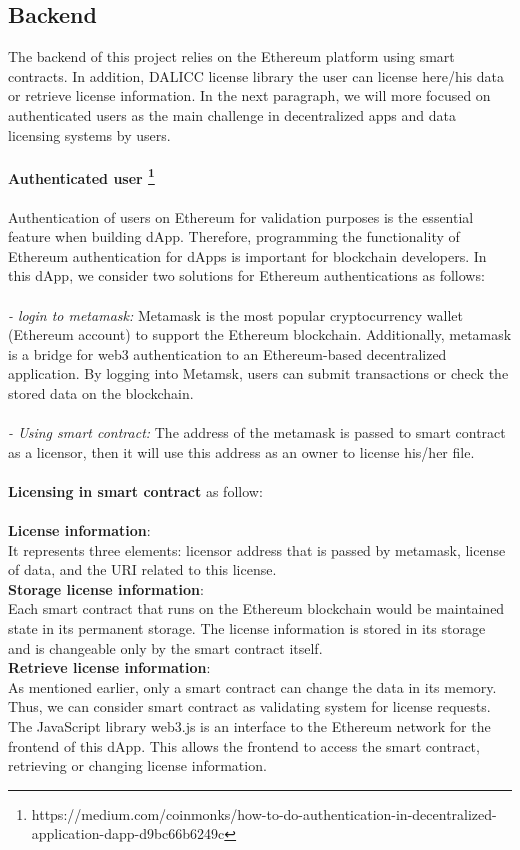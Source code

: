 \subsection{Backend} The backend of this project relies on the Ethereum platform using smart contracts. In addition, DALICC license library the user can license here/his data or retrieve license information. In the next paragraph, we will more focused on authenticated users as the main challenge in decentralized apps and data licensing systems by users. \\
\\
\textbf{Authenticated user \footnote{https://medium.com/coinmonks/how-to-do-authentication-in-decentralized-application-dapp-d9bc66b6249c}} \\
\\
Authentication of users on Ethereum for validation purposes is the essential feature when building dApp.  Therefore, programming the functionality of Ethereum authentication for dApps is important for blockchain developers. 
In this dApp, we consider two solutions for Ethereum authentications as follows: \\
\\
\textit{- login to metamask:} Metamask is the most popular cryptocurrency wallet (Ethereum account) to support the Ethereum blockchain. Additionally, metamask is a bridge for web3 authentication to an Ethereum-based decentralized application. By logging into Metamsk, users can submit transactions or check the stored data on the blockchain.\\
\\
\textit{- Using smart contract:} The address of the metamask is passed to smart contract as a licensor, then it will
use this address as an owner to license his/her file. \\
\\
\textbf{Licensing in smart contract} as follow: \\
\\
\textbf{License information}:\\ It represents three elements: licensor address that is passed by metamask, license of data, and the URI related to this license.\\
\textbf{Storage license information}: \\Each smart contract that runs on the Ethereum blockchain would be maintained state in its permanent storage. The license information is stored in its storage and is changeable only by the smart contract itself.\\
\textbf{Retrieve license information}: \\As mentioned earlier, only a smart contract can change the data in its memory. Thus, we can consider smart contract as validating system for license requests. The JavaScript
library web3.js is an interface to the Ethereum network for the frontend of this dApp. This allows the frontend to access the smart contract, retrieving or changing license information.\\

